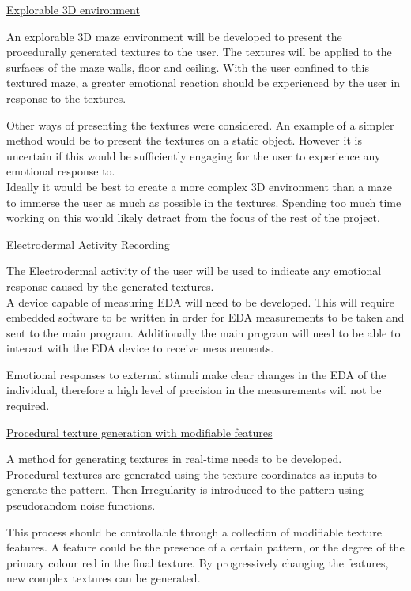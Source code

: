 \documentclass{report}
\begin{document}
\vspace{0.5cm}

\noindent\underline{Explorable 3D environment}

An explorable 3D maze environment will be developed to present the procedurally generated textures to the user. The textures will be applied to the surfaces of the
maze walls, floor and ceiling. With the user confined to this textured maze, a greater emotional reaction should be experienced by the user in response to the textures.

Other ways of presenting the textures were considered. An example of a simpler method would be to present the textures on a static object. However it is uncertain if this
would be sufficiently engaging for the user to experience any emotional response to.\\
Ideally it would be best to create a more complex 3D environment than a maze to immerse the user as much as possible in the textures. Spending too much time working
on this would likely detract from the focus of the rest of the project.

\hypertarget{txt:r2}{\noindent\underline{Electrodermal Activity Recording}}

The Electrodermal activity of the user will be used to indicate any emotional response caused by the generated textures.\\
A device capable of measuring EDA will need to be developed. This will require embedded software to be written in order for EDA measurements to be taken and sent to the main program.
Additionally the main program will need to be able to interact with the EDA device to receive measurements.

Emotional responses to external stimuli make clear changes in the EDA of the individual, therefore a high level of precision in the measurements will not be required.

\noindent\underline{Procedural texture generation with modifiable features}

A method for generating textures in real-time needs to be developed.\\
Procedural textures are generated using the texture coordinates as inputs to generate the pattern. Then Irregularity is introduced to the pattern using pseudorandom noise functions.

This process should be controllable through a collection of modifiable texture features. A feature could be the presence of a certain pattern, or the degree of the 
primary colour red in the final texture.
By progressively changing the features, new complex textures can be generated.
\end{document}
